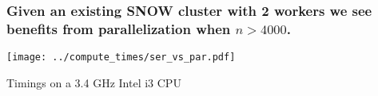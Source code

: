 \documentclass{beamer}
\begin{document}
\begin{frame}

\frametitle{Given an existing SNOW cluster with 2 workers we see benefits
    from parallelization when $n > 4000$.}

\centerline{\texttt{[image: ../compute\_times/ser\_vs\_par.pdf]}}

Timings on a 3.4 GHz Intel i3 CPU

%
%
%

%
%
%
%
%
\end{frame}
\end{document}
